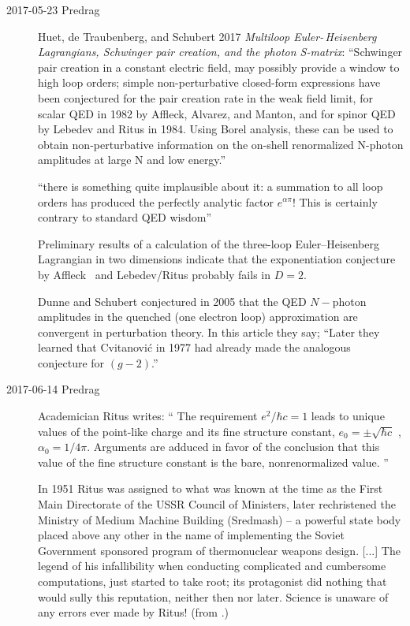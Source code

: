 \begin{description}
\item[2017-05-23 Predrag]
Huet, de Traubenberg, and Schubert 2017
{\em Multiloop {Euler-\,Heisenberg Lagrangians, Schwinger} pair creation,
and the photon {S-matrix}}:
``Schwinger pair creation in a constant electric field, may possibly
provide a window to high loop orders; simple non-perturbative closed-form
expressions have been conjectured for the pair creation rate in the weak
field limit, for scalar QED in 1982 by Affleck, Alvarez, and
Manton, and for spinor QED by Lebedev and
Ritus in 1984. Using Borel analysis, these can be used to
obtain non-perturbative information on the on-shell renormalized N-photon
amplitudes at large N and low energy.''

``there is something quite implausible about it: a summation to all loop
orders has produced the perfectly analytic factor $e^{\alpha\pi}$! This is
certainly contrary to standard QED wisdom''

Preliminary results of a calculation of the three-loop Euler--Heisenberg
Lagrangian in two dimensions indicate that the exponentiation conjecture
by Affleck \etal\ and Lebedev/Ritus probably fails in $D = 2$.

Dunne and Schubert conjectured in 2005 that the QED $N-$photon amplitudes
in the quenched (one electron loop) approximation are convergent in
perturbation theory. In this article they say; ``Later they learned
that Cvitanovi\'c in 1977 had already made the analogous conjecture for
$(g-2)$.''

\item[2017-06-14 Predrag]
Academician Ritus writes: ``
The requirement  {$ e^{2}/\hbar c = 1$} leads to unique values of the
point-like charge and its fine structure constant, {$ e_{0} = \pm
\sqrt{\hbar c}$} , {$ \alpha_{0} = 1/4 \pi$}. Arguments are adduced in
favor of the conclusion that this value of the fine structure constant is
the bare, nonrenormalized value.
''

In 1951 Ritus was assigned to what was known at the time as the First Main
Directorate of the USSR Council of Ministers, later rechristened the
Ministry of Medium Machine Building (Sredmash) -- a powerful state body
placed above any other in the name of implementing the Soviet Government
sponsored program of thermonuclear weapons design. [...]
The legend of his infallibility when conducting complicated and
cumbersome computations, just started to take root; its protagonist did
nothing that would sully this reputation, neither then nor later. Science
is unaware of any errors ever made by Ritus! (from .)


\end{description}
